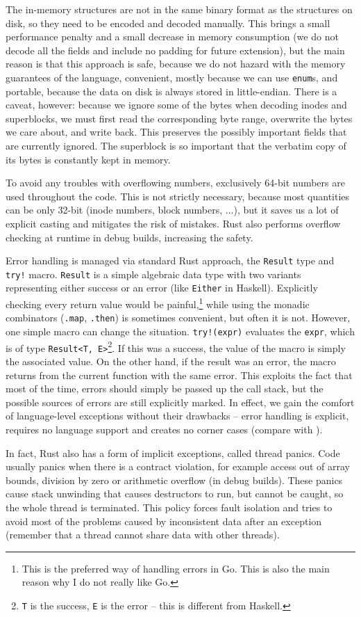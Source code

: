 The in-memory structures are not in the same binary format as the structures on
disk, so they need to be encoded and decoded manually. This brings a small
performance penalty and a small decrease in memory consumption (we do not decode
all the fields and include no padding for future extension), but the main reason
is that this approach is safe, because we do not hazard with the memory
guarantees of the language, convenient, mostly because we can use
\texttt{enum}s, and portable, because the data on disk is always stored in
little-endian. There is a caveat, however: because we ignore some of the bytes
when decoding inodes and superblocks, we must first read the corresponding byte
range, overwrite the bytes we care about, and write back. This preserves the
possibly important fields that are currently ignored. The superblock is so
important that the verbatim copy of its bytes is constantly kept in memory.

To avoid any troubles with overflowing numbers, exclusively 64-bit numbers are
used throughout the code. This is not strictly necessary, because most
quantities can be only 32-bit (inode numbers, block numbers, ...), but it saves
us a lot of explicit casting and mitigates the risk of mistakes. Rust also
performs overflow checking at runtime in debug builds, increasing the safety.

Error handling is managed via standard Rust approach, the \texttt{Result} type
and \texttt{try!} macro. \texttt{Result} is a simple algebraic data type with
two variants representing either success or an error (like \texttt{Either} in
Haskell). Explicitly checking every return value would be painful,\footnote{This
is the preferred way of handling errors in Go. This is also the main reason why
I do not really like Go.} while using the monadic combinators (\texttt{.map},
\texttt{.then}) is sometimes convenient, but often it is not. However, one
simple macro can change the situation. \texttt{try!(expr)} evaluates the
\texttt{expr}, which is of type \texttt{Result<T, E>}\footnote{\texttt{T} is the
success, \texttt{E} is the error -- this is different from Haskell.}. If this
was a success, the value of the macro is simply the associated value. On the
other hand, if the result was an error, the macro returns from the current
function with the same error. This exploits the fact that most of the time,
errors should simply be passed up the call stack, but the possible sources of
errors are still explicitly marked. In effect, we gain the comfort of
language-level exceptions without their drawbacks -- error handling is explicit,
requires no language support and creates no corner cases (compare with
\Cplusplus).

In fact, Rust also has a form of implicit exceptions, called thread panics. Code
usually panics when there is a contract violation, for example access out of
array bounds, division by zero or arithmetic overflow (in debug builds). These
panics cause stack unwinding that causes destructors to run, but cannot be
caught, so the whole thread is terminated. This policy forces fault isolation
and tries to avoid most of the problems caused by inconsistent data after an
exception (remember that a thread cannot share data with other threads).
